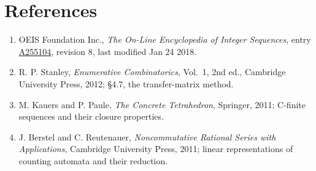 \documentclass[11pt]{article}
\theoremstyle{definition}
\begin{document}
\section{References}

\begin{enumerate}

\item OEIS Foundation Inc., \emph{The On-Line Encyclopedia of Integer Sequences}, entry \href{https://oeis.org/A255104}{A255104}, revision 8, last modified Jan 24 2018.

\item R. P. Stanley, \emph{Enumerative Combinatorics}, Vol.~1, 2nd ed., Cambridge University Press, 2012; \S4.7, the transfer-matrix method.

\item M. Kauers and P. Paule, \emph{The Concrete Tetrahedron}, Springer, 2011; C-finite sequences and their closure properties.

\item J. Berstel and C. Reutenauer, \emph{Noncommutative Rational Series with Applications}, Cambridge University Press, 2011; linear representations of counting automata and their reduction.

\end{enumerate}
\end{document}
